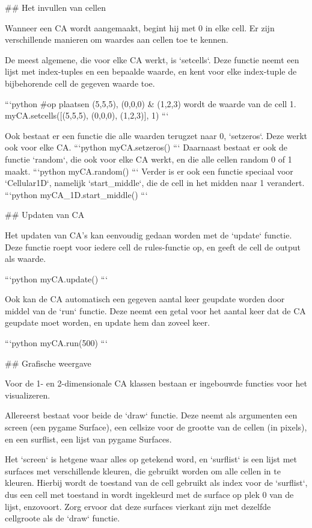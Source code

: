 \documentclass{article}
\begin{document}
\begin{markdown}
## Het invullen van cellen

Wanneer een CA wordt aangemaakt, begint hij met 0 in elke cell. Er zijn verschillende manieren om waardes aan cellen toe te kennen. 

De meest algemene, die voor elke CA werkt, is `setcells`. Deze functie neemt een lijst met index-tuples en een bepaalde waarde, en kent voor elke index-tuple de bijbehorende cell de gegeven waarde toe. 

```python
#op plaatsen (5,5,5), (0,0,0) & (1,2,3) wordt de waarde van de cell 1. 
myCA.setcells([(5,5,5), (0,0,0), (1,2,3)], 1)
```

Ook bestaat er een functie die alle waarden terugzet naar 0, `setzeros`. Deze werkt ook voor elke CA.
```python
myCA.setzeros()
```
Daarnaast bestaat er ook de functie `random`, die ook voor elke CA werkt, en die alle cellen random 0 of 1 maakt. 
```python
myCA.random()
```
Verder is er ook een functie speciaal voor `Cellular1D`, namelijk `start_middle`, die de cell in het midden naar 1 verandert. 
```python
myCA_1D.start_middle()
```

## Updaten van CA

Het updaten van CA's kan eenvoudig gedaan worden met de `update` functie. Deze functie roept voor iedere cell de rules-functie op, en geeft de cell de output als waarde. 

```python
myCA.update()
```

Ook kan de CA automatisch een gegeven aantal keer geupdate worden door middel van de `run` functie. Deze neemt een getal voor het aantal keer dat de CA geupdate moet worden, en update hem dan zoveel keer.

```python
myCA.run(500)
```

## Grafische weergave

Voor de 1- en 2-dimensionale CA klassen bestaan er ingebouwde functies voor het visualizeren. 

Allereerst bestaat voor beide de `draw` functie. Deze neemt als argumenten een screen (een pygame Surface), een cellsize voor de grootte van de cellen (in pixels), en een surflist, een lijst van pygame Surfaces. 

Het `screen` is hetgene waar alles op getekend word, en `surflist` is een lijst met surfaces met verschillende kleuren, die gebruikt worden om alle cellen in te kleuren. Hierbij wordt de toestand van de cell gebruikt als index voor de `surflist`, dus een cell met toestand in wordt ingekleurd met de surface op plek 0 van de lijst, enzovoort. Zorg ervoor dat deze surfaces vierkant zijn met dezelfde cellgroote als de `draw` functie.


\end{markdown}
\end{document}
